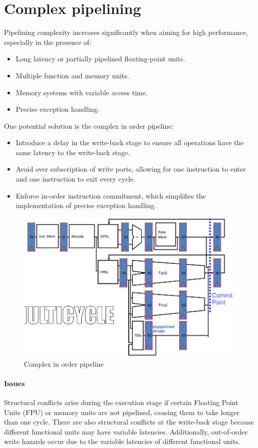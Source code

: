 \section{Complex pipelining}

Pipelining complexity increases significantly when aiming for high performance, especially in the presence of:
\begin{itemize}
    \item Long latency or partially pipelined floating-point units.
    \item Multiple function and memory units.
    \item Memory systems with variable access time.
    \item Precise exception handling.
\end{itemize}
One potential solution is the complex in order pipeline:
\begin{itemize}
    \item Introduce a delay in the write-back stage to ensure all operations have the same latency to the write-back stage.
    \item Avoid over subscription of write ports, allowing for one instruction to enter and one instruction to exit every cycle.
    \item Enforce in-order instruction commitment, which simplifies the implementation of precise exception handling.
\end{itemize}
\begin{figure}[H]
    \centering
    \includegraphics[width=0.3\linewidth]{images/ciop.png}
    \caption{Complex in order pipeline}
\end{figure}

\paragraph*{Issues}
Structural conflicts arise during the execution stage if certain Floating Point Units (FPU) or memory units are not pipelined, causing them to take longer than one cycle.
There are also structural conflicts at the write-back stage because different functional units may have variable latencies.
Additionally, out-of-order write hazards occur due to the variable latencies of different functional units.
